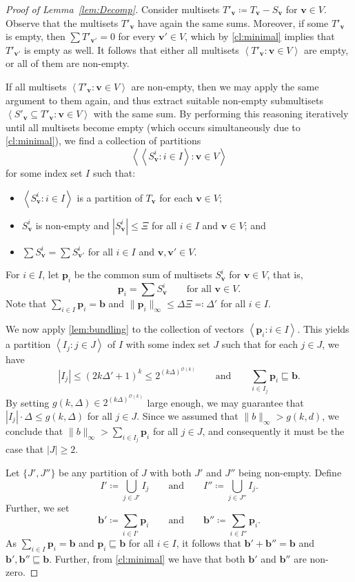\documentclass{article}
\renewcommand{\leq}{\leqslant}
\renewcommand{\geq}{\geqslant}
\newcommand{\cfleq}{\sqsubseteq}
\newcommand{\tup}[1]{{\mathbf{#1}}}
\newcommand{\bb}{\tup b}
\newcommand{\pp}{\tup p}
\newcommand{\myvv}{\tup v} %
\newcommand{\mset}[1]{\left\langle #1\right\rangle}
\newcommand{\Oh}{{\mathcal{O}}}
\renewcommand{\setminus}{-}
\begin{document}
\begin{proof}[Proof of Lemma~\ref{lem:Decomp}]
Consider multisets $T'_\myvv\coloneqq T_\myvv\setminus S_\myvv$ for $\myvv\in V$. Observe that the multisets $T'_\myvv$ have again the same sums. Moreover, if some $T'_\myvv$ is empty, then $\sum T'_{\myvv'}=0$ for every $\myvv'\in V$, which by \cref{cl:minimal} implies that $T'_{\myvv'}$ is empty as well. It follows that either all multisets $\mset{T'_\myvv\colon \myvv\in V}$ are empty, or all of them are non-empty.

If all multisets $\mset{T'_\myvv\colon \myvv\in V}$ are non-empty, then we may apply the same argument to them again, and thus extract suitable non-empty submultisets $\mset{S'_\myvv\subseteq T'_\myvv\colon \myvv\in V}$ with the same sum. By performing this reasoning iteratively until all multisets become empty (which occurs simultaneously due to \cref{cl:minimal}), we find a collection of partitions
$$\mset{\mset{S_\myvv^i\colon i\in I}\colon \myvv\in V}$$
for some index set $I$ such that:
\begin{itemize}[nosep]
    \item $\mset{S_\myvv^i\colon i\in I}$ is a partition of $T_\myvv$ for each $\myvv\in V$;
    \item $S_\myvv^i$ is non-empty and $|S_\myvv^i|\leq \Xi$ for all $i\in I$ and $\myvv\in V$; and
    \item $\sum S^i_\myvv=\sum S^i_{\myvv'}$ for all $i\in I$ and $\myvv,\myvv'\in V$.
\end{itemize}
For $i\in I$, let $\pp_i$ be the common sum of multisets $S^i_\myvv$ for $\myvv\in V$, that is,
$$\pp_i= \sum S^i_\myvv\qquad\textrm{for all }\myvv\in V.$$
Note that $\sum_{i\in I}\pp_i = \bb$ and $\|\pp_i\|_\infty\leq \Delta\Xi\eqqcolon \Delta'$ for all $i\in I$.

We now apply \cref{lem:bundling} to the collection of vectors $\mset{\pp_i\colon i\in I}$. This yields a partition $\mset{I_j\colon j\in J}$ of $I$ with some index set $J$ such that for each $j\in J$, we have
$$|I_j|\leq (2k\Delta'+1)^{k}\leq  2^{(k\Delta)^{\Oh(k)}}\qquad\textrm{and}\qquad \sum_{i\in I_j} \pp_i\cfleq \bb.$$
By setting $g(k,\Delta)\in 2^{(k\Delta)^{\Oh(k)}}$ large enough, we may guarantee that $|I_j|\cdot \Delta\leq g(k,\Delta)$ for all $j\in J$. Since we assumed that $\|b\|_\infty>g(k,d)$, we conclude that $\|b\|_\infty>\sum_{i\in I_j} \pp_i$ for all $j\in J$, and consequently it must be the case that $|J|\geq 2$.

Let $\{J',J''\}$ be any partition of $J$ with both $J'$ and $J''$ being non-empty. Define
$$I'\coloneqq \bigcup_{j\in J'} I_j\qquad \textrm{and}\qquad I''\coloneqq \bigcup_{j\in J''} I_j.$$
Further, we set
$$\bb'\coloneqq \sum_{i\in I'} \pp_i\qquad \textrm{and}\qquad\bb''\coloneqq \sum_{i\in I''} \pp_i.$$
As $\sum_{i\in I} \pp_i=\bb$ and $\pp_i\cfleq \bb$ for all $i\in I$, it follows that $\bb'+\bb''=\bb$ and $\bb',\bb''\cfleq \bb$. Further, from \cref{cl:minimal} we have that both $\bb'$ and $\bb''$ are non-zero.


\end{proof}
\end{document}
